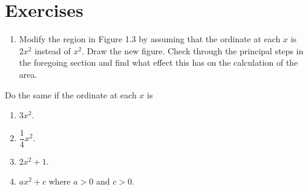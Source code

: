 \section{Exercises}\label{sec:1.1.4}

\begin{ex}\label{ex:1.1.4.1}
  \begin{enumerate}
    \item Modify the region in Figure 1.3 by assuming that the ordinate at each \(x\) is \(2 x^2\) instead of \(x^2\).
          Draw the new figure.
          Check through the principal steps in the foregoing section and find what effect this has on the calculation of the area.
  \end{enumerate}
  Do the same if the ordinate at each \(x\) is
  \begin{enumerate}[resume]
    \item \(3 x^2\).
    \item \(\dfrac{1}{4} x^2\).
    \item \(2 x^2 + 1\).
    \item \(a x^2 + c\) where \(a > 0\) and \(c > 0\).
  \end{enumerate}
\end{ex}


